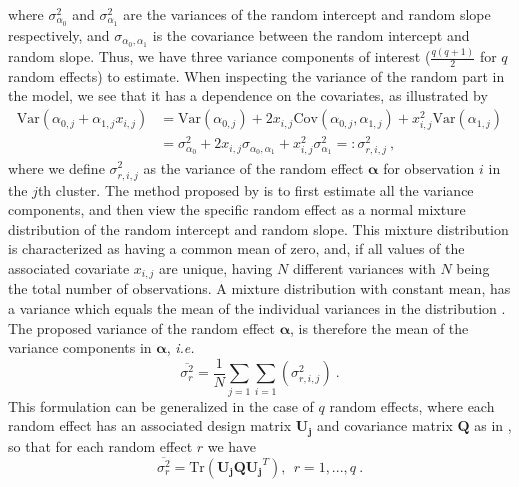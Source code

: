 where $\sigma^2_{\alpha_0}$ and $\sigma^2_{\alpha_1}$ are the variances of the random intercept and random slope respectively, and $\sigma_{\alpha_0, \alpha_1}$ is the covariance between the random intercept and random slope.
Thus, we have three variance components of interest ($\frac{q(q+1)}{2}$ for $q$ random effects) to estimate. 
When inspecting the variance of the random part in the model, we see that it has a dependence on the covariates, as illustrated by 
\begin{equation}
    \begin{aligned}
    \text{Var}(\alpha_{0, j} + \alpha_{1, j}x_{i, j}) &= \text{Var}(\alpha_{0, j}) + 2x_{i, j} \text{Cov}(\alpha_{0, j}, \alpha_{1, j}) + x^2_{i, j}\text{Var}(\alpha_{1, j}) \\
    & = \sigma^2_{\alpha_0} + 2x_{i, j}\sigma_{\alpha_0, \alpha_1} + x^2_{i, j}\sigma^2_{\alpha_1} =: \sigma^2_{r, i, j} \ ,
    \end{aligned}
\end{equation}
where we define $\sigma^2_{r, i, j}$ as the variance of the random effect $\boldsymbol{\alpha}$ for observation $i$ in the $j$th cluster. 
The method proposed by \citet{Johnson2014} is to first estimate all the variance components, and then view the specific random effect as a normal mixture distribution of the random intercept and random slope.
This mixture distribution is characterized as having a common mean of zero, and, if all values of the associated covariate $x_{i, j}$ are unique, having $N$ different variances with $N$ being the total number of observations.
A mixture distribution with constant mean, has a variance which equals the mean of the individual variances in the distribution \citep[citing Behboodian 1970]{Johnson2014}. 
The proposed variance of the random effect $\boldsymbol{\alpha}$, is therefore the mean of the variance components in $\boldsymbol{\alpha}$, \textit{i.e.}
\begin{equation}
    \overline{\sigma^2_{r}} = \frac{1}{N}\sum_{j=1}\sum_{i=1} \left(\sigma^2_{r, i, j} \right) \ .
\end{equation}
This formulation can be generalized in the case of $q$ random effects, where each random effect has an associated design matrix $\mathbf{U_j}$ and covariance matrix $\mathbf{Q}$ as in , so that for each random effect $r$ we have
\begin{equation}
    \overline{\sigma^2_{r}} = \text{Tr}( \mathbf{U_j}\mathbf{Q}\mathbf{U_j}^T), \ \ r=1, ..., q \ .
\end{equation}
